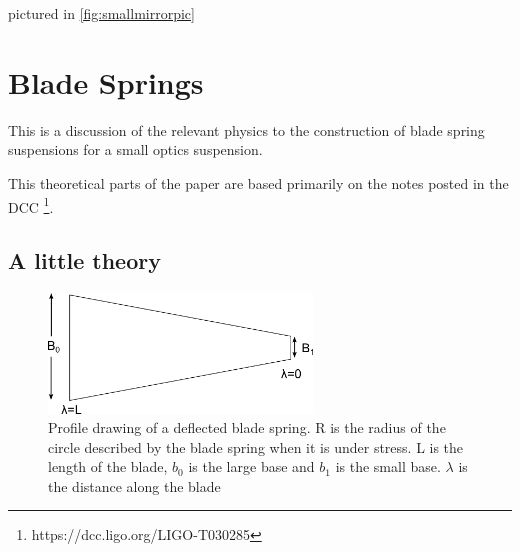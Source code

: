 pictured in \ref{fig:smallmirrorpic}

\section{Blade Springs}


This is a discussion of the relevant physics to the construction of blade spring suspensions for a small optics suspension.

This theoretical parts of the paper are based primarily on the notes posted in the DCC
\footnote{https://dcc.ligo.org/LIGO-T030285}.

\subsection{A little theory}
\label{sec:theory}

\begin{figure}[ht]		
\centering
\includegraphics[width=7cm]{figures/suspensions/bladeWidth.png}
	\caption[Blade springs]{Profile drawing of a deflected blade spring. R is the radius of the circle described by the blade spring
	when it is under stress. L is the length of the blade, $b_0$ is the large base and $b_1$ is the small base. $\lambda$ is the distance along the blade}
	\label{fig:bladeIllustration}
\end{figure}

